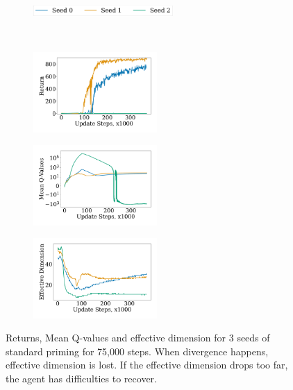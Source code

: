 \begin{figure}[H]
\centering
    \begin{subfigure}[b]{0.8\textwidth}
        \centering
        \includegraphics[height=0.4cm]{figures/dissecting/priming/elu_dim_return_legend.pdf}
    \end{subfigure}\\%
    \begin{subfigure}[b]{0.33\textwidth}
        \centering
        \includegraphics[width=4.7cm, trim=1cm 1cm 1cm 1cm ,clip]{figures/dissecting/priming/elu_dim_return.pdf}
        \label{subfig:elu_dim_ret}
    \end{subfigure}%
    \begin{subfigure}[b]{0.33\textwidth}
    \centering
        \includegraphics[width=4.7cm, trim=1cm 1cm 1cm 1cm ,clip]{figures/dissecting/priming/elu_dim_Q.pdf}
        \label{subfig:priming_dim_Q}
    \end{subfigure}%
    \begin{subfigure}[b]{0.33\textwidth}
        \centering
        \includegraphics[width=4.7cm, trim=1cm 1cm 1cm 1cm ,clip]{figures/dissecting/priming/elu_dim_ed.pdf}
        \label{subfig:elu_priming_dim_ed}
    \end{subfigure}%
    \vspace{-5pt}
    \caption{Returns, Mean Q-values and effective dimension for $3$ seeds of standard priming for 75,000 steps. When divergence happens, effective dimension is lost. If the effective dimension drops too far, the agent has difficulties to recover.}
    \label{fig:elu_priming_dim}
\end{figure}

